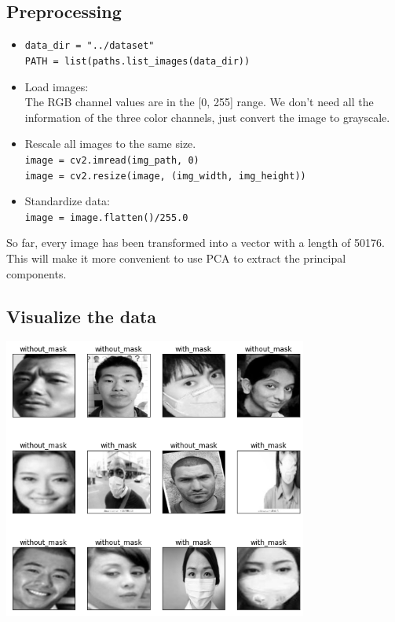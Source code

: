 \documentclass{article}
\newcommand{\code}[1]{\colorbox{light-gray}{\texttt{#1}}}
\begin{document}
\subsection{Preprocessing}
\begin{itemize}
  \item \code{data\_dir = "../dataset"}\\
        \code{PATH = list(paths.list\_images(data\_dir))}
  \item Load images:\\
        The RGB channel values are in the [0, 255] range. We don’t need all the information of the three color channels, just convert the image to grayscale.
  \item Rescale all images to the same size.\\
        \code{image = cv2.imread(img\_path, 0)}\\
        \code{image = cv2.resize(image, (img\_width, img\_height))}
  \item Standardize data:\\
        \code{image = image.flatten()/255.0}
\end{itemize}

So far, every image has been transformed into a vector with a length of 50176.
This will make it more convenient to use PCA to extract the principal components.

\subsection{Visualize the data}
\begin{center}
  \includegraphics[width=10cm]{preview1.png}
\end{center}
\end{document}
